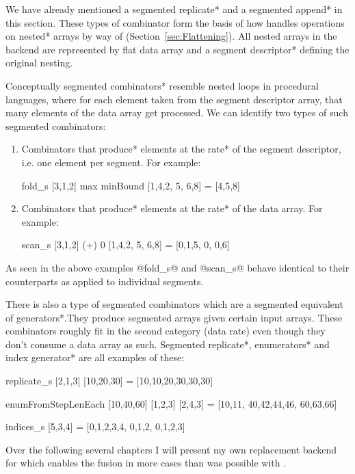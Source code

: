 \documentclass[preamble.tex]{subfiles}
\begin{document}
We have already mentioned a \*segmented replicate* and a \*segmented append* in this section. These types of combinator form the basis of how \DPH handles operations on \*nested* arrays by way of  (Section~\ref{sec:Flattening}). All nested arrays in the \DPH backend are represented by flat data array and a \*segment descriptor* defining the original nesting.

Conceptually \*segmented combinators* resemble nested loops in procedural languages, where for each element taken from the segment descriptor array, that many elements of the data array get processed. We can identify two types of such segmented combinators:
\begin{enumerate}
\item Combinators that \*produce* elements at the \*rate* of the segment descriptor, i.e. one element per segment. For example:

\begin{hscode}
fold_s [3,1,2] max minBound [1,4,2, 5, 6,8] = [4,5,8]
\end{hscode}

\item Combinators that \*produce* elements at the \*rate* of the data array. For example:

\begin{hscode}
scan_s [3,1,2] (+) 0 [1,4,2, 5, 6,8] = [0,1,5, 0, 0,6]
\end{hscode}
\end{enumerate}

As seen in the above examples @fold_s@ and @scan_s@ behave identical to their  counterparts as applied to individual segments.

There is also a type of segmented combinators which are a segmented equivalent of \*generators*.\igencomb They produce segmented arrays given certain input arrays. These combinators roughly fit in the second category (data rate) even though they don't consume a data array as such. \*Segmented replicate*, \*enumerators* and \*index generator* are all examples of these:

\begin{hscode}
replicate_s [2,1,3] [10,20,30] = [10,10,20,30,30,30]

enumFromStepLenEach [10,40,60] [1,2,3] [2,4,3]
  = [10,11, 40,42,44,46, 60,63,66]

indices_s [5,3,4] = [0,1,2,3,4, 0,1,2, 0,1,2,3]
\end{hscode}




Over the following several chapters I will present my own replacement backend for  which enables the fusion in more cases than was possible with .


\IfNotCompilingAll{}
\end{document}

